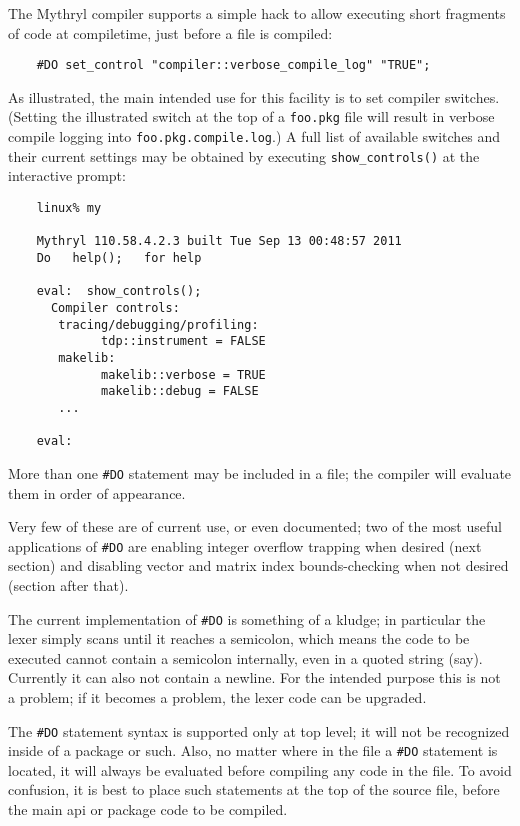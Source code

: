 The Mythryl compiler supports a simple hack to allow executing short 
fragments of code at compiletime, just before a file is compiled: 

\begin{verbatim}
    #DO set_control "compiler::verbose_compile_log" "TRUE";
\end{verbatim}

As illustrated, the main intended use for this facility is to set 
compiler switches.  (Setting the illustrated switch at the top of 
a {\tt foo.pkg} file will result in verbose compile logging into 
{\tt foo.pkg.compile.log}.)  A full list of available switches and their 
current settings may be obtained by executing {\tt show\_controls()} 
at the interactive prompt:

\begin{verbatim}
    linux% my

    Mythryl 110.58.4.2.3 built Tue Sep 13 00:48:57 2011
    Do   help();   for help

    eval:  show_controls();
      Compiler controls:
       tracing/debugging/profiling:
             tdp::instrument = FALSE
       makelib:
             makelib::verbose = TRUE
             makelib::debug = FALSE
       ...

    eval:  
\end{verbatim}

More than one {\tt #DO} statement may be included in a file;  the 
compiler will evaluate them in order of appearance.

Very few of these are of current use, or even documented;  two of the 
most useful applications of {\tt #DO} are enabling integer overflow 
trapping when desired (next section) and 
disabling vector and matrix index bounds-checking when not desired 
(section after that).

The current implementation of {\tt #DO} is something of a kludge;  in 
particular the lexer simply scans until it reaches a semicolon, which 
means the code to be executed cannot contain a semicolon internally, 
even in a quoted string (say).  Currently it can also not contain a newline.
For the intended purpose this is not  a problem;  if it becomes a problem,
the lexer code can be upgraded. 

The {\tt #DO} statement syntax is supported only at top level;  it 
will not be recognized inside of a package or such.  Also, no matter 
where in the file a {\tt #DO} statement is located, it will always 
be evaluated before compiling any code in the file.  To avoid confusion, 
it is best to place such statements at the top of the source file, 
before the main api or package code to be compiled.

